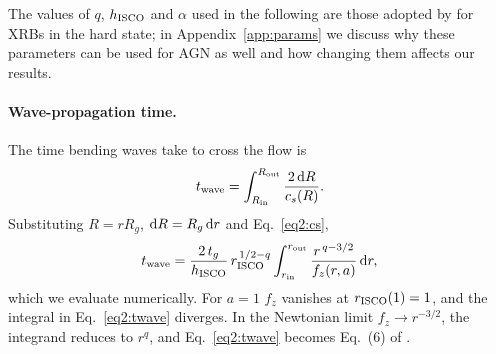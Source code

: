 The values of $q$, $h_\textup{ISCO}$ and $\alpha$ used in the following are those adopted by \citet{Motta2017} for XRBs in the hard state; in Appendix~\ref{app:params} we discuss why these parameters can be used for AGN as well and how changing them affects our results.


\paragraph{Wave-propagation time.}
The time bending waves take to cross the flow is \citep[][Eq.~5]{Motta2017}
\begin{equation}
    \label{eq2:twave_int}
    t_\textup{wave}=\int_{R_\textup{in}}^{R_\textup{out}}\frac{2\,\textup{d}R}{c_s(R)} .
\end{equation}
Substituting $R=rR_g$, $\textup{d}R=R_g\,\textup{d}r$ and Eq.~\eqref{eq2:cs},
\begin{equation}
    \label{eq2:twave}
    t_\textup{wave}=\frac{2\,t_g}{h_\textup{ISCO}}\,r_\textup{ISCO}^{\,1/2-q}\int_{r_\textup{in}}^{r_\textup{out}}\frac{r^{\,q-3/2}}{f_z(r,a)}\,\textup{d}r ,
\end{equation}
which we evaluate numerically.
For $a=1$ $f_z$ vanishes at $r_\textup{ISCO}(1)=1$, and the integral in Eq.~\eqref{eq2:twave} diverges.
In the Newtonian limit $f_z\to r^{-3/2}$, the integrand reduces to $r^{q}$, and Eq.~\eqref{eq2:twave} becomes Eq.~(6) of \citet{Motta2017}.


